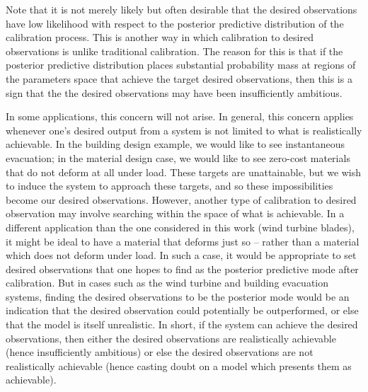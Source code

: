 \documentclass{article}
\begin{document}
Note that it is not merely likely but often desirable that the desired observations have low likelihood with respect to the posterior predictive distribution of the calibration process. This is another way in which calibration to desired observations is unlike traditional calibration. The reason for this is that if the posterior predictive distribution places substantial probability mass at regions of the parameters space that achieve the target desired observations, then this is a sign that the the desired observations may have been insufficiently ambitious. 

In some applications, this concern will not arise. In general, this concern applies whenever one's desired output from a system is not limited to what is realistically achievable. In the building design example, we would like to see instantaneous evacuation; in the material design case, we would like to see zero-cost materials that do not deform at all under load. These targets are unattainable, but we wish to induce the system to approach these targets, and so these impossibilities become our desired observations. However, another type of calibration to desired observation may involve searching within the space of what is achievable. In a different application than the one considered in this work (wind turbine blades), it might be ideal to have a material that deforms just so -- rather than a material which does not deform under load. In such a case, it would be appropriate to set desired observations that one hopes to find as the posterior predictive mode after calibration. But in cases such as the wind turbine and building evacuation systems, finding the desired observations to be the posterior mode would be an indication that the desired observation could potentially be outperformed, or else that the model is itself unrealistic. In short, if the system can achieve the desired observations, then either the desired observations are realistically achievable (hence insufficiently ambitious) or else the desired observations are not realistically achievable (hence casting doubt on a model which presents them as achievable).
\end{document}
